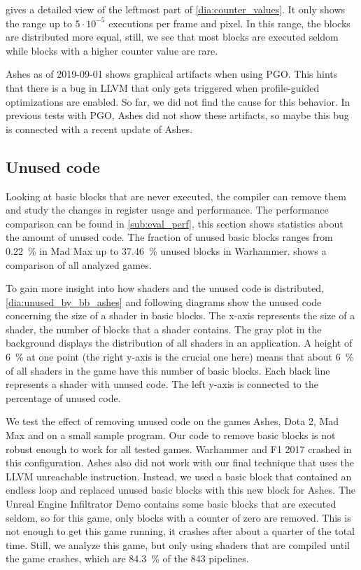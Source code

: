  gives a detailed view of the leftmost part of \cref{dia:counter_values}.
It only shows the range up to $5\cdot 10^{-5}$ executions per frame and pixel.
In this range, the blocks are distributed more equal, still, we see that most blocks are executed seldom while blocks with a higher counter value are rare.


Ashes as of 2019-09-01 shows graphical artifacts when using PGO.
This hints that there is a bug in LLVM that only gets triggered when profile-guided optimizations are enabled.
So far, we did not find the cause for this behavior.
In previous tests with PGO, Ashes did not show these artifacts, so maybe this bug is connected with a recent update of Ashes.

\subsection{Unused code}
\label{sub:eval_unused}
Looking at basic blocks that are never executed, the compiler can remove them and study the changes in register usage and performance.
The performance comparison can be found in \cref{sub:eval_perf}, this section shows statistics about the amount of unused code.
The fraction of unused basic blocks ranges from \SI{0.22}{\percent} in Mad Max up to \SI{37.46}{\percent} unused blocks in Warhammer.
 shows a comparison of all analyzed games.


To gain more insight into how shaders and the unused code is distributed, \cref{dia:unused_by_bb_ashes} and following diagrams show the unused code concerning the size of a shader in basic blocks.
The x-axis represents the size of a shader, the number of blocks that a shader contains.
The gray plot in the background displays the distribution of all shaders in an application.
A height of \SI{6}{\percent} at one point (the right y-axis is the crucial one here) means that about \SI{6}{\percent} of all shaders in the game have this number of basic blocks.
Each black line represents a shader with unused code. The left y-axis is connected to the percentage of unused code.


We test the effect of removing unused code on the games Ashes, Dota 2, Mad Max and on a small sample program.
Our code to remove basic blocks is not robust enough to work for all tested games. Warhammer and F1 2017 crashed in this configuration.
Ashes also did not work with our final technique that uses the LLVM unreachable instruction.
Instead, we used a basic block that contained an endless loop and replaced unused basic blocks with this new block for Ashes.
The Unreal Engine Infiltrator Demo contains some basic blocks that are executed seldom, so for this game, only blocks with a counter of zero are removed.
This is not enough to get this game running, it crashes after about a quarter of the total time.
Still, we analyze this game, but only using shaders that are compiled until the game crashes, which are \SI{84.3}{\percent} of the 843 pipelines.

